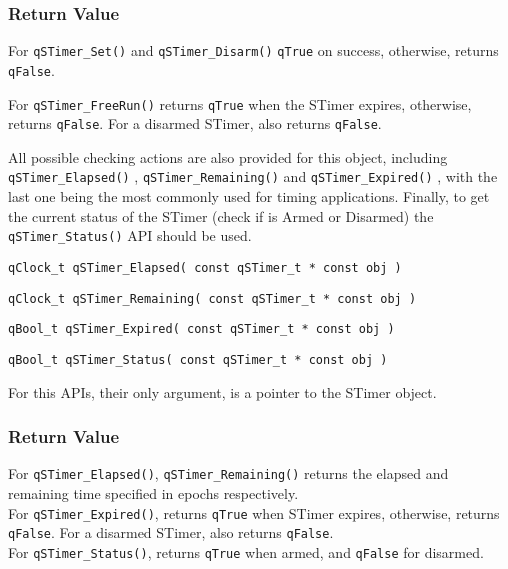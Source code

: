 \subsubsection*{Return Value}
For \lstinline{qSTimer_Set()} and \lstinline{qSTimer_Disarm()} \lstinline{qTrue} on success, otherwise, returns \lstinline{qFalse}.

For \lstinline{qSTimer_FreeRun()} returns \lstinline{qTrue} when the STimer expires, otherwise, returns \lstinline{qFalse}. For a disarmed STimer, also returns \lstinline{qFalse}. 


\noindent\hrulefill

\medskip
All possible checking actions are also provided for this object, including \lstinline{qSTimer_Elapsed()} , \lstinline{qSTimer_Remaining()}  and \lstinline{qSTimer_Expired()} , with the last one being the most commonly used for timing applications.
Finally, to get the current status of the STimer (check if is Armed or Disarmed) the \lstinline{qSTimer_Status()}  API should be used.
\medskip

\begin{lstlisting}[style=CStyle]
qClock_t qSTimer_Elapsed( const qSTimer_t * const obj )
\end{lstlisting}

\begin{lstlisting}[style=CStyle]
qClock_t qSTimer_Remaining( const qSTimer_t * const obj )
\end{lstlisting}

\begin{lstlisting}[style=CStyle]
qBool_t qSTimer_Expired( const qSTimer_t * const obj )
\end{lstlisting}

\begin{lstlisting}[style=CStyle]
qBool_t qSTimer_Status( const qSTimer_t * const obj )
\end{lstlisting}

For this APIs, their only argument, is a pointer to the STimer object.

\subsubsection*{Return Value}
For \lstinline{qSTimer_Elapsed()}, \lstinline{qSTimer_Remaining()} returns the elapsed and remaining time specified in epochs respectively. \\
For \lstinline{qSTimer_Expired()}, returns \lstinline{qTrue} when STimer expires, otherwise, returns \lstinline{qFalse}. For a disarmed STimer, also returns \lstinline{qFalse}. \\
For \lstinline{qSTimer_Status()}, returns \lstinline{qTrue} when armed, and \lstinline{qFalse} for disarmed.

